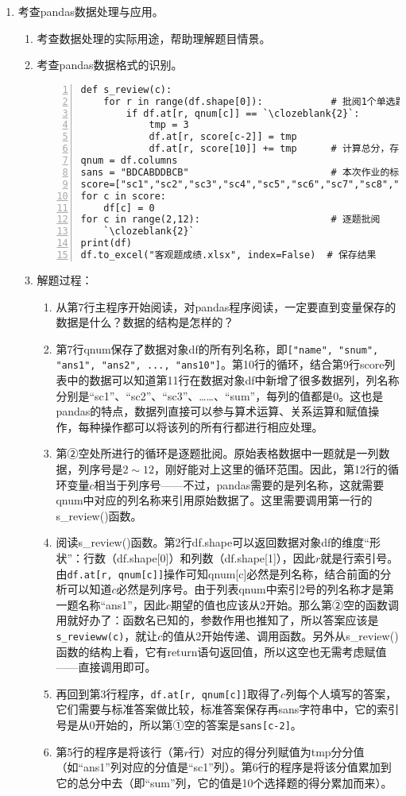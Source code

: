 \begin{enumerate}
\item 考查pandas数据处理与应用。
	\begin{enumerate}[label=$(\arabic*)$]
	\item 考查数据处理的实际用途，帮助理解题目情景。
	\item 考查pandas数据格式的识别。
\setcounter{qnumber}{1}
\begin{lstlisting}[numbers=left]
def s_review(c):    
    for r in range(df.shape[0]):            # 批阅1个单选题
        if df.at[r, qnum[c]] == `\clozeblank{2}`:
            tmp = 3
            df.at[r, score[c-2]] = tmp
            df.at[r, score[10]] += tmp      # 计算总分，存入"sum"列
qnum = df.columns
sans = "BDCABDDBCB"                         # 本次作业的标准答案
score=["sc1","sc2","sc3","sc4","sc5","sc6","sc7","sc8","sc9","sc10","sum"]
for c in score:
    df[c] = 0
for c in range(2,12):                       # 逐题批阅
    `\clozeblank{2}`
print(df)
df.to_excel("客观题成绩.xlsx", index=False)  # 保存结果
\end{lstlisting}
	\item 解题过程：
		\begin{enumerate}[label=$(\alph*)$]
		\item 从第7行主程序开始阅读，对pandas程序阅读，一定要直到变量保存的数据是什么？数据的结构是怎样的？
		\item 第7行qnum保存了数据对象df的所有列名称，即\lstinline|["name", "snum", "ans1", "ans2", ..., "ans10"]|。第10行的循环，结合第9行score列表中的数据可以知道第11行在数据对象df中新增了很多数据列，列名称分别是“sc1”、“sc2”、“sc3”、……、“sum”，每列的值都是0。这也是pandas的特点，数据列直接可以参与算术运算、关系运算和赋值操作，每种操作都可以将该列的所有行都进行相应处理。
		\item 第②空处所进行的循环是逐题批阅。原始表格数据中一题就是一列数据，列序号是$2 \sim 12$，刚好能对上这里的循环范围。因此，第12行的循环变量$c$相当于列序号——不过，pandas需要的是列名称，这就需要qnum中对应的列名称来引用原始数据了。这里需要调用第一行的s\_review()函数。
		\item 阅读s\_review()函数。第2行df.shape可以返回数据对象df的维度“形状”：行数（df.shape[0]）和列数（df.shape[1]），因此$r$就是行索引号。由\lstinline|df.at[r, qnum[c]]|操作可知qnum[c]必然是列名称，结合前面的分析可以知道$c$必然是列序号。由于列表qnum中索引$2$号的列名称才是第一题名称“ans1”，因此$c$期望的值也应该从$2$开始。那么第②空的函数调用就好办了：函数名已知的，参数作用也推知了，所以答案应该是\lstinline|s_revieww(c)|，就让$c$的值从2开始传递、调用函数。另外从s\_review()函数的结构上看，它有return语句返回值，所以这空也无需考虑赋值——直接调用即可。
		\item 再回到第3行程序，\lstinline|df.at[r, qnum[c]]|取得了$c$列每个人填写的答案，它们需要与标准答案做比较，标准答案保存再sans字符串中，它的索引号是从0开始的，所以第①空的答案是\lstinline|sans[c-2]|。
		\item 第5行的程序是将该行（第$r$行）对应的得分列赋值为tmp分分值（如“ans1”列对应的分值是“sc1”列）。第6行的程序是将该分值累加到它的总分中去（即“sum”列，它的值是10个选择题的得分累加而来）。
		\end{enumerate}
	\end{enumerate}



\end{enumerate}
